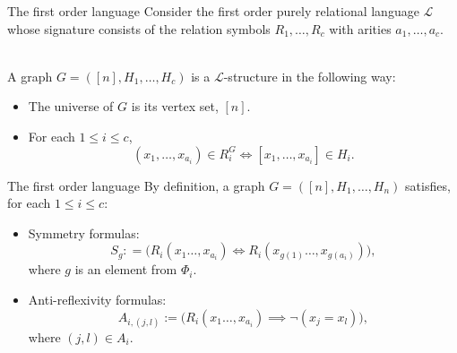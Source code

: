 \documentclass[handout, 11pt]{beamer}
\begin{document}
	\begin{frame}{The first order language}
	Consider the first order purely relational language $\mathcal{L}$ whose signature consists of the relation symbols
	$R_1,\dots, R_c$ with arities $a_1,\dots,a_c$. \\~ \par
	
	A graph $G=([n],H_1,\dots, H_c)$ is a $\mathcal{L}$-structure in the following way:
	\begin{itemize}
		\item The universe of $G$ is its vertex set, $[n]$.
		\item For each $1\leq i \leq c$, 
		\[(x_1,\dots,x_{a_i})\in R_i^G \iff [x_1,\dots, x_{a_i}]\in H_i. \] 
	\end{itemize}
	\end{frame}

	\begin{frame}{The first order language}
		By definition, a graph $G=([n],H_1,\dots, H_n)$ satisfies, for each $1\leq i \leq c$:
		\vspace{0.5 em}
		\begin{itemize}
			\item Symmetry formulas:
			\[ S_g: =\big( R_i(x_1\dots,x_{a_i})\iff R_i(x_{g(1)}\dots,x_{g(a_i)})\big) ,\]
			where $g$ is an element from $\Phi_i$.
			\item Anti-reflexivity formulas:
			\[A_{i,(j,l)}:=\big(R_i(x_1\dots,x_{a_i})\implies 
			\neg(x_j= x_l)\big),\]
			where $(j,l)\in A_i$.
		\end{itemize}
		
	\end{frame}
	 
\end{document}
